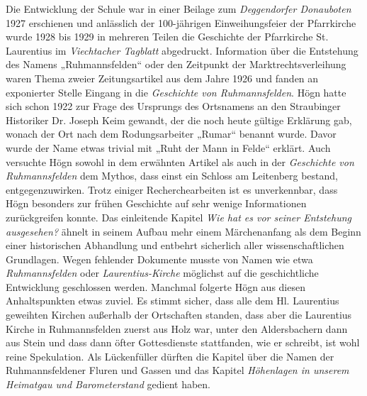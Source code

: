 \documentclass{book}
\begin{document}
Die Entwicklung der Schule war in einer Beilage zum \textit{Deggendorfer
Donau\-boten} 1927 erschienen und anlässlich der 100-jährigen
Einweihungsfeier der Pfarrkirche wurde 1928 bis 1929 in mehreren Teilen
die Geschichte der Pfarr\-kirche St. Laurentius im \textit{Viechtacher
Tagblatt} abgedruckt. Information über die Entstehung des Namens
„Ruhmannsfelden“ oder den Zeitpunkt der Markt\-rechtsverleihung waren
Thema zweier Zeitungsartikel aus dem Jahre 1926 und fanden an
exponierter Stelle Eingang in die \textit{Geschichte von
Ruhmannsfelden}. Högn hatte sich schon 1922 zur Frage des Ursprungs des
Ortsnamens an den Strau\-binger Historiker Dr. Joseph Keim gewandt, der
die noch heute gültige Er\-klärung gab, wonach der Ort nach dem
Rodungsarbeiter „Rumar“ benannt wurde. Davor wurde der Name etwas
trivial mit „Ruht der Mann in Felde“ er\-klärt. Auch versuchte Högn
sowohl in dem erwähnten Artikel als auch in der \textit{Geschichte von
Ruhmannsfelden} dem Mythos, dass einst ein Schloss am Leitenberg
bestand, entgegenzuwirken. Trotz einiger Recherchearbeiten ist es
unverkenn\-bar, dass Högn besonders zur frühen Geschichte auf sehr
wenige Infor\-mationen zurückgreifen konnte. Das einleitende Kapitel
\textit{Wie hat es vor seiner Entstehung ausgesehen?} ähnelt in seinem
Aufbau mehr einem Märchenanfang als dem Beginn einer historischen
Abhandlung und entbehrt sicherlich aller wis\-senschaftlichen
Grundlagen. Wegen fehlender Dokumente musste von Na\-men wie etwa
\textit{Ruhmannsfelden }oder \textit{Laurentius-Kirche} möglichst auf
die geschicht\-liche Entwicklung geschlossen werden. Manchmal folgerte
Högn aus diesen Anhaltspunkten etwas zuviel. Es stimmt sicher, dass
alle dem Hl. Laurentius geweihten Kirchen außerhalb der Ortschaften
standen, dass aber die Lauren\-tius Kirche in Ruhmannsfelden zuerst aus
Holz war, unter den Aldersbachern dann aus Stein und dass dann öfter
Gottesdienste stattfanden, wie er schreibt, ist wohl reine Spekulation.
Als Lückenfüller dürften die Kapitel über die Na\-men der
Ruhmannsfeldener Fluren und Gassen und das Kapitel \textit{Höhenlagen
in unserem Heimatgau und Barometerstand} gedient haben.

\end{document}
